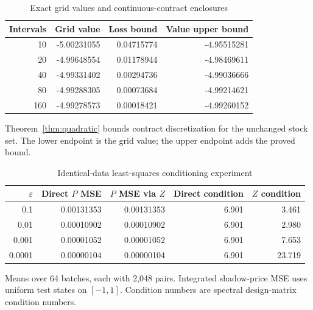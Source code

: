 \clearpage
\begin{table}[!ht]
\centering
\caption{Exact grid values and continuous-contract enclosures}
\label{tab:contractgrid}
\begin{tabular}{rrrr}
\toprule
Intervals & Grid value & Loss bound & Value upper bound\\
\midrule
10 & -5.00231055 & 0.04715774 & -4.95515281\\
20 & -4.99648554 & 0.01178944 & -4.98469611\\
40 & -4.99331402 & 0.00294736 & -4.99036666\\
80 & -4.99288305 & 0.00073684 & -4.99214621\\
160 & -4.99278573 & 0.00018421 & -4.99260152\\
\bottomrule
\end{tabular}
\par\smallskip
\begin{minipage}{0.98\textwidth}\small Theorem~\ref{thm:quadratic} bounds contract discretization for the unchanged stock set. The lower endpoint is the grid value; the upper endpoint adds the proved bound.\end{minipage}
\end{table}

\begin{table}[!ht]
\centering
\caption{Identical-data least-squares conditioning experiment}
\label{tab:conditioning}
\begin{tabular}{rrrrr}
\toprule
$\varepsilon$ & Direct $P$ MSE &  $P$ MSE via $Z$ & Direct condition & $Z$ condition\\
\midrule
0.1 & 0.00131353 & 0.00131353 & 6.901 & 3.461\\
0.01 & 0.00010902 & 0.00010902 & 6.901 & 2.980\\
0.001 & 0.00001052 & 0.00001052 & 6.901 & 7.653\\
0.0001 & 0.00000104 & 0.00000104 & 6.901 & 23.719\\
\bottomrule
\end{tabular}
\par\smallskip
\begin{minipage}{0.98\textwidth}\small Means over 64 batches, each with 2,048 pairs. Integrated shadow-price MSE uses uniform test states on $[-1,1]$. Condition numbers are spectral design-matrix condition numbers.\end{minipage}
\end{table}

